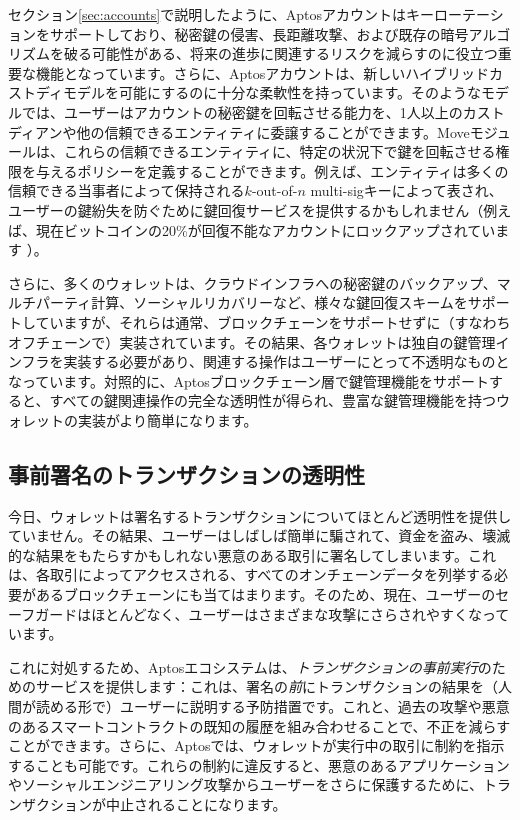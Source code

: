 \documentclass{article}
\begin{document}
セクション\ref{sec:accounts}で説明したように、Aptosアカウントはキーローテーションをサポートしており、秘密鍵の侵害、長距離攻撃、および既存の暗号アルゴリズムを破る可能性がある、将来の進歩に関連するリスクを減らすのに役立つ重要な機能となっています。さらに、Aptosアカウントは、新しいハイブリッドカストディモデルを可能にするのに十分な柔軟性を持っています。そのようなモデルでは、ユーザーはアカウントの秘密鍵を回転させる能力を、1人以上のカストディアンや他の信頼できるエンティティに委譲することができます。Moveモジュールは、これらの信頼できるエンティティに、特定の状況下で鍵を回転させる権限を与えるポリシーを定義することができます。例えば、エンティティは多くの信頼できる当事者によって保持される$k$-out-of-$n$ multi-sigキーによって表され、ユーザーの鍵紛失を防ぐために鍵回復サービスを提供するかもしれません（例えば、現在ビットコインの20\%が回復不能なアカウントにロックアップされています \cite{lost_passwords}）。

さらに、多くのウォレットは、クラウドインフラへの秘密鍵のバックアップ、マルチパーティ計算、ソーシャルリカバリーなど、様々な鍵回復スキームをサポートしていますが、それらは通常、ブロックチェーンをサポートせずに（すなわちオフチェーンで）実装されています。その結果、各ウォレットは独自の鍵管理インフラを実装する必要があり、関連する操作はユーザーにとって不透明なものとなっています。対照的に、Aptosブロックチェーン層で鍵管理機能をサポートすると、すべての鍵関連操作の完全な透明性が得られ、豊富な鍵管理機能を持つウォレットの実装がより簡単になります。

\subsection{事前署名のトランザクションの透明性}
\label{sub:pre-signing_transaction_transparency}

今日、ウォレットは署名するトランザクションについてほとんど透明性を提供していません。その結果、ユーザーはしばしば簡単に騙されて、資金を盗み、壊滅的な結果をもたらすかもしれない悪意のある取引に署名してしまいます。これは、各取引によってアクセスされる、すべてのオンチェーンデータを列挙する必要があるブロックチェーンにも当てはまります。そのため、現在、ユーザーのセーフガードはほとんどなく、ユーザーはさまざまな攻撃にさらされやすくなっています。

これに対処するため、Aptosエコシステムは、\emph{トランザクションの事前実行}のためのサービスを提供します：これは、署名の\emph{前}にトランザクションの結果を（人間が読める形で）ユーザーに説明する予防措置です。これと、過去の攻撃や悪意のあるスマートコントラクトの既知の履歴を組み合わせることで、不正を減らすことができます。さらに、Aptosでは、ウォレットが実行中の取引に制約を指示することも可能です。これらの制約に違反すると、悪意のあるアプリケーションやソーシャルエンジニアリング攻撃からユーザーをさらに保護するために、トランザクションが中止されることになります。
\end{document}
